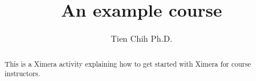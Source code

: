 \documentclass{xourse}
\title{An example course}%
\author{Tien Chih Ph.D.}
\begin{document}
      
\begin{abstract} %
      
This is a Ximera activity explaining how to get started with Ximera for course instructors.
      
\end{abstract}
      
\maketitle
      

      
      
      

      
\end{document}
